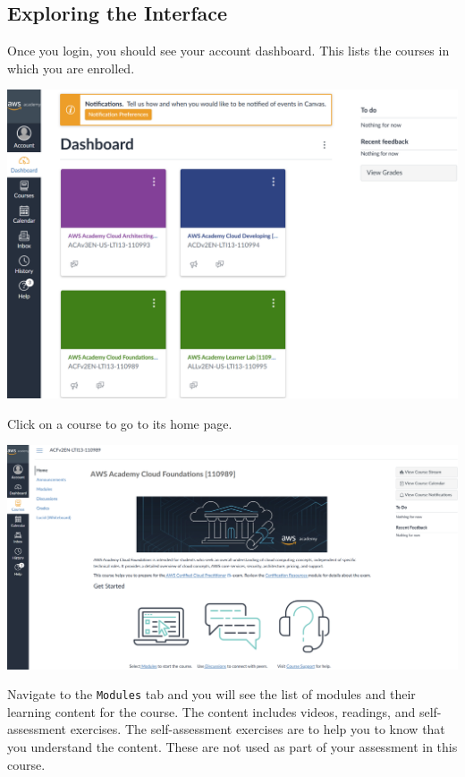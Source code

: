 \subsection{Exploring the Interface}
Once you login, you should see your account dashboard.
This lists the courses in which you are enrolled.

\vspace{4mm}
\noindent
\includegraphics[width=\textwidth]{images/dashboard}
\vspace{2mm}

\noindent
Click on a course to go to its home page.

\vspace{4mm}
\noindent
\includegraphics[width=\textwidth]{images/foundations-home}
\vspace{3mm}

\noindent
Navigate to the \texttt{Modules} tab and you will see the list of modules and their learning content for the course.
The content includes videos, readings, and self-assessment exercises.
The self-assessment exercises are to help you to know that you understand the content.
These are not used as part of your assessment in this course.

